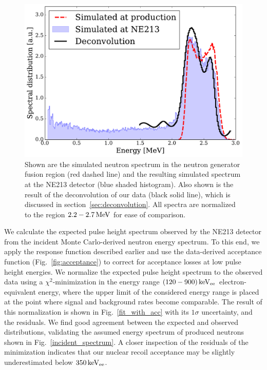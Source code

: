 \begin{figure}[!htbp]
\centering
    \includegraphics[width=\linewidth]{figures/ng/mc_spectrum}
    \caption{Shown are the simulated neutron spectrum in the neutron generator fusion region (red dashed line) and the resulting simulated spectrum at the NE213 detector (blue shaded histogram). Also shown is the result of the deconvolution of our data (black solid line), which is discussed in section~\ref{sec:deconvolution}. All spectra are normalized to the region $2.2 - 2.7\,\mathrm{MeV}$ for ease of comparison.}\label{fig:incident_spectrum}
\end{figure}

We calculate the expected pulse height spectrum observed by the NE213 detector from the incident Monte Carlo-derived neutron energy spectrum. To this end, we apply the response function described earlier and use the data-derived acceptance function (Fig.~\ref{fig:acceptance}) to correct for acceptance losses at low pulse height energies. We normalize the expected pulse height spectrum to the observed data using a $\chi^2$-minimization in the energy range $(120-900)\,\mathrm{keV_{ee}}$ electron-equivalent energy, where the upper limit of the considered energy range is placed at the point where signal and background rates become comparable. The result of this normalization is shown in Fig.~\ref{fit_with_acc} with its $1\sigma$ uncertainty, and the residuals. We find good agreement between the expected and observed distributions, validating the assumed energy spectrum of produced neutrons shown in Fig.~\ref{incident_spectrum}. A closer inspection of the residuals of the minimization indicates that our nuclear recoil acceptance may be slightly underestimated below $350\,\mathrm{keV_{ee}}$.

